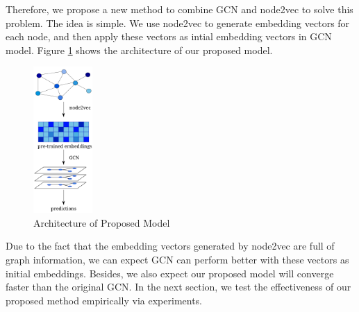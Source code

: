 \documentclass[sigconf]{acmart}
\begin{document}
Therefore, we propose a new method to combine GCN and node2vec to solve this problem. The idea is simple. We use node2vec to generate embedding vectors for each node, and then apply these vectors as intial embedding vectors in GCN model. Figure \ref{proposed} shows the architecture of our proposed model. 
\begin{figure}[!ht]
	\centering
	\includegraphics[width=0.2\textwidth]{./figs/proposed-model.png}
	\caption{Architecture of Proposed Model}
	\label{proposed}
\end{figure}
Due to the fact that the embedding vectors generated by node2vec are full of graph information, we can expect GCN can perform better with these vectors as initial embeddings. Besides, we also expect our proposed model will converge faster than the original GCN. In the next section, we test the effectiveness of our proposed method empirically via experiments. 
\end{document}
